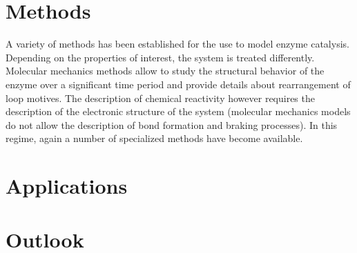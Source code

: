\section{Methods}\label{sec:methods}
A variety of methods has been established for the use to model enzyme catalysis.
Depending on the properties of interest, the system is treated differently.
Molecular mechanics methods allow to study the structural behavior of the enzyme over a significant time period and provide details about rearrangement of loop motives.
The description of chemical reactivity however requires the description of the electronic structure of the system (molecular mechanics models do not allow the description of bond formation and braking processes).
In this regime, again a number of specialized methods have become available.




\section{Applications}\label{sec:apps}




\section{Outlook}\label{sec:out}
